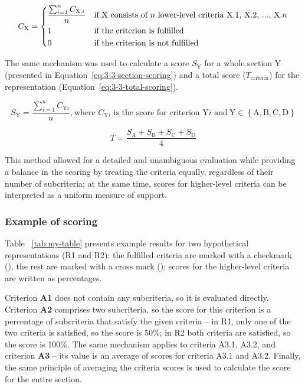 \begin{equation}
    C_\text{X} =
\begin{dcases}
    \frac{\sum_{i=1}^{n} C_{\text{X.$i$}}}{n} & \text{if X consists of $n$ lower-level criteria X.1, X.2, ..., X.$n$}\\
    1                                         & \text{if the criterion is fulfilled}\\
    0                                         & \text{if the criterion is not fulfilled}
\end{dcases}
    \label{eq:3-3-criterion-scoring}
\end{equation}

The same mechanism was used to calculate a score $S_{\text{Y}}$ for a whole section Y (presented in Equation~\ref{eq:3-3-section-scoring}) and a total score ($T_{\text{criteria}}$) for the representation (Equation~\ref{eq:3-3-total-scoring}).

\begin{equation}
    S_{\text{Y}} = \frac{\sum_{i=1}^{n} C_{\text{Y$i$}}}{n}\text{,}\ \text{where $C_{\text{Y$i$}}$ is the score for criterion Y$i$ and}\ \text{Y} \in \left\{\text{A}, \text{B}, \text{C}, \text{D} \right\}
    \label{eq:3-3-section-scoring}
\end{equation}

\begin{equation}
    T = \frac{S_{\text{A}} + S_{\text{B}} + S_{\text{C}} + S_{\text{D}}}{4}
    \label{eq:3-3-total-scoring}
\end{equation}

This method allowed for a detailed and unambiguous evaluation while providing a balance in the scoring by treating the criteria equally, regardless of their number of subcriteria;
at the same time, scores for higher-level criteria can be interpreted as a uniform measure of support.

\subsubsection{Example of scoring}
Table ~\ref{tab:my-table} presents example results for two hypothetical representations (R1 and R2): the fulfilled criteria are marked with a checkmark (\cmark), the rest are marked with a cross mark (\xmark);
scores for the higher-level criteria are written as percentages.

Criterion \textbf{A1} does not contain any subcriteria, so it is evaluated directly.
Criterion \textbf{A2} comprises two subcriteria, so the score for this criterion is a percentage of subcriteria that satisfy the given criteria -- in R1, only one of the two criteria is satisfied, so the score is 50\%; in R2 both criteria are satisfied, so the score is 100\%.
The same mechanism applies to criteria A3.1, A3.2, and criterion \textbf{A3} -- its value is an average of scores for criteria A3.1 and A3.2.
Finally, the same principle of averaging the criteria scores is used to calculate the score for the entire section.

